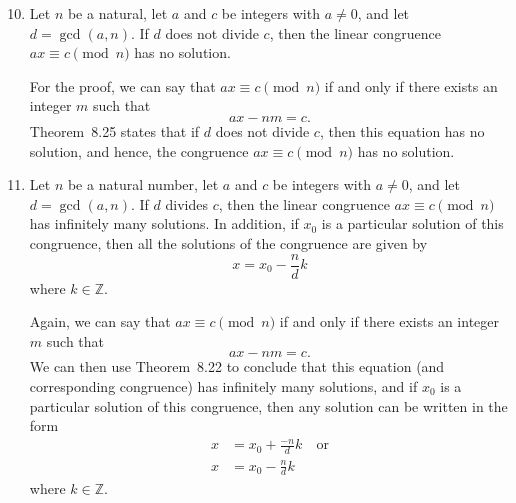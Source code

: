 \documentclass[11pt]{article}
\begin{document}
\begin{enumerate} \setcounter{enumi}{9}
\item Let $n$ be a natural, let $a$ and $c$ be integers with $a \ne 0$, and let 
$d = \gcd \left( {a, n} \right)$.  If  $d$ does  not divide $c$, then the linear congruence 
$ax \equiv c \pmod n$ has no solution.

\eighth
For the proof, we can say that $ax \equiv c \pmod n$ if and only if there exists an integer $m$ such that
\[
ax - nm = c.
\]
Theorem~8.25 states that if $d$ does not divide $c$, then this equation has no solution, and hence, the congruence $ax \equiv c \pmod n$ has no solution.

\item Let $n$ be a natural number, let $a$ and $c$ be integers with $a \ne 0$, and let 
$d = \gcd \left( {a, n} \right)$.  If  $d$ divides $c$, then the linear congruence 
$ax \equiv c \pmod n$ has infinitely many solutions.  In addition, if $x_0$ is a particular solution of this congruence, then all the solutions of the congruence are given by
\[
x = x_0 - \frac{n}{d} k
\]
where $k \in \mathbb{Z}$.

\eighth
Again, we can say that $ax \equiv c \pmod n$ if and only if there exists an integer $m$ such that
\[
ax - nm = c.
\]
We can then use Theorem~8.22 to conclude that this equation (and corresponding congruence) has infinitely many solutions, and if $x_0$ is a particular solution of this congruence, then any solution can be written in the form 
\begin{align*}
x &= x_0 + \frac{-n}{d} k \quad \text{or} \\
x &= x_0 - \frac{n}{d} k
\end{align*}
where $k \in \mathbb{Z}$.



\end{enumerate}
\end{document}

